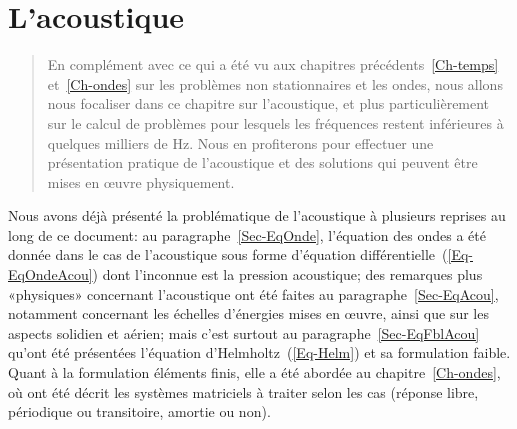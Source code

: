 \chapter{L'acoustique}\label{Ch-Acous}
\begin{abstract}
En complément avec ce qui a été vu aux chapitres précédents~\ref{Ch-temps} et~\ref{Ch-ondes} sur les problèmes non stationnaires et les ondes, nous allons nous focaliser dans ce chapitre sur l'acoustique, et plus particulièrement sur le calcul de problèmes pour lesquels les fréquences restent inférieures à quelques milliers de Hz. Nous en profiterons pour effectuer une présentation pratique de l'acoustique et des solutions qui peuvent être mises en œuvre physiquement.
\end{abstract}
\newlength\HauteurDesEPS
\ifVersionDuDocEstVincent\setlength\HauteurDesEPS{57mm}\else\setlength\HauteurDesEPS{50mm}\fi

Nous avons déjà présenté la problématique de l'acoustique à plusieurs reprises au long de ce document: au paragraphe~\ref{Sec-EqOnde}, l'équation des ondes a été donnée dans le cas de l'acoustique sous forme d'équation différentielle~(\ref{Eq-EqOndeAcou}) dont l'inconnue est la pression acoustique; des remarques plus «physiques» concernant l'acoustique ont été faites au paragraphe~\ref{Sec-EqAcou}, notamment concernant les échelles d'énergies mises en œuvre, ainsi que sur les aspects solidien et aérien; mais c'est surtout au paragraphe~\ref{Sec-EqFblAcou} qu'ont été présentées l'équation d'Helmholtz~(\ref{Eq-Helm}) et sa formulation faible. Quant à la formulation éléments finis, elle a été abordée au chapitre~\ref{Ch-ondes}, où ont été décrit les systèmes matriciels à traiter selon les cas (réponse libre, périodique ou transitoire, amortie ou non).

